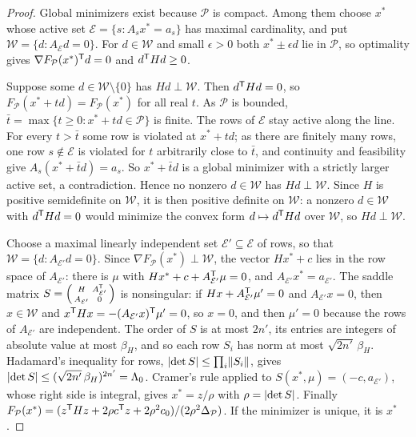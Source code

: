 \begin{proof}
Global minimizers exist because $\mathcal P$ is compact. Among them choose
$x^*$ whose active set $\mathcal E=\{s:A_sx^*=a_s\}$ has maximal
cardinality, and put $\mathcal W=\{d:A_{\mathcal E}d=0\}$. For
$d\in\mathcal W$ and small $\epsilon>0$ both $x^*\pm\epsilon d$ lie in
$\mathcal P$, so optimality gives $\nabla F_{\mathcal P}(x^*)^{\mathsf T}d=0$ and
$d^{\mathsf T}Hd\ge0$.

Suppose some $d\in\mathcal W\setminus\{0\}$ has $Hd\perp\mathcal W$. Then
$d^{\mathsf T}Hd=0$, so $F_{\mathcal P}(x^*+td)=F_{\mathcal P}(x^*)$ for all real
$t$. As $\mathcal P$ is bounded, $\bar t=\max\{t\ge0:x^*+td\in\mathcal P\}$
is finite. The rows of $\mathcal E$ stay active along the line. For every
$t>\bar t$ some row is violated at $x^*+td$; as there are finitely many
rows, one row $s\notin\mathcal E$ is violated for $t$ arbitrarily close to
$\bar t$, and continuity and feasibility give $A_s(x^*+\bar td)=a_s$. So
$x^*+\bar td$ is a global minimizer with a strictly larger active set, a
contradiction. Hence no nonzero $d\in\mathcal W$ has $Hd\perp\mathcal W$.
Since $H$ is positive semidefinite on $\mathcal W$, it is then positive
definite on $\mathcal W$: a nonzero $d\in\mathcal W$ with $d^{\mathsf T}Hd=0$ would
minimize the convex form $d\mapsto d^{\mathsf T}Hd$ over $\mathcal W$, so
$Hd\perp\mathcal W$.

Choose a maximal linearly independent set $\mathcal E'\subseteq\mathcal E$
of rows, so that $\mathcal W=\{d:A_{\mathcal E'}d=0\}$. Since
$\nabla F_{\mathcal P}(x^*)\perp\mathcal W$, the vector $Hx^*+c$ lies in the
row space of $A_{\mathcal E'}$: there is $\mu$ with
$Hx^*+c+A_{\mathcal E'}^{\mathsf T}\mu=0$, and $A_{\mathcal E'}x^*=a_{\mathcal E'}$.
The saddle matrix
$S=\left(\begin{smallmatrix}H&A_{\mathcal E'}^{\mathsf T}\\A_{\mathcal E'}&0\end{smallmatrix}\right)$
is nonsingular: if $Hx+A_{\mathcal E'}^{\mathsf T}\mu'=0$ and $A_{\mathcal E'}x=0$,
then $x\in\mathcal W$ and $x^{\mathsf T}Hx=-(A_{\mathcal E'}x)^{\mathsf T}\mu'=0$, so $x=0$,
and then $\mu'=0$ because the rows of $A_{\mathcal E'}$ are independent. The
order of $S$ is at most $2n'$, its entries are integers of absolute value at
most $\beta_H$, and so each row $S_i$ has norm at most $\sqrt{2n'}\,\beta_H$.
Hadamard's inequality for rows, $\lvert \det S\rvert\le\prod_i\lVert S_i\rVert$, gives
$\lvert \det S\rvert\le(\sqrt{2n'}\,\beta_H)^{2n'}=\Lambda_0$. Cramer's rule applied
to $S(x^*,\mu)=(-c,a_{\mathcal E'})$, whose right side is integral, gives
$x^*=z/\rho$ with $\rho=\lvert \det S\rvert$. Finally
$F_{\mathcal P}(x^*)=(z^{\mathsf T}Hz+2\rho c^{\mathsf T}z+2\rho^2c_0)/(2\rho^2\Delta_{\mathcal P})$.
If the minimizer is unique, it is $x^*$.
\end{proof}

